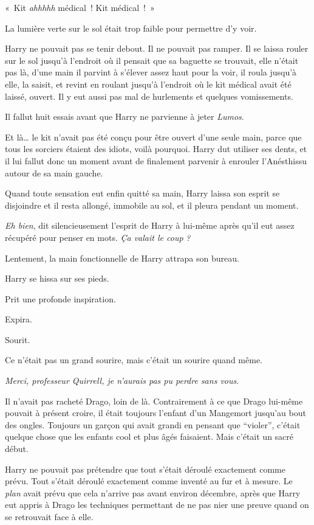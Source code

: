 «~Kit \emph{ahhhhh} médical~! Kit médical~!~»

La lumière verte sur le sol était trop faible pour permettre d'y voir.

Harry ne pouvait pas se tenir debout. Il ne pouvait pas ramper. Il se laissa rouler sur le sol jusqu'à l'endroit où il pensait que sa baguette se trouvait, elle n'était pas là, d'une main il parvint à s'élever assez haut pour la voir, il roula jusqu'à elle, la saisit, et revint en roulant jusqu'à l'endroit où le kit médical avait été laissé, ouvert. Il y eut aussi pas mal de hurlements et quelques vomissements.

Il fallut huit essais avant que Harry ne parvienne à jeter \emph{Lumos}.

Et là… le kit n'avait pas été conçu pour être ouvert d'une seule main, parce que tous les sorciers étaient des idiots, voilà pourquoi. Harry dut utiliser ses dents, et il lui fallut donc un moment avant de finalement parvenir à enrouler l'Anésthissu autour de sa main gauche.

Quand toute sensation eut enfin quitté sa main, Harry laissa son esprit se disjoindre et il resta allongé, immobile au sol, et il pleura pendant un moment.

\emph{Eh bien}, dit silencieusement l'esprit de Harry à lui-même après qu'il eut assez récupéré pour penser en mots. \emph{Ça valait le coup} \emph{?}

Lentement, la main fonctionnelle de Harry attrapa son bureau.

Harry se hissa sur ses pieds.

Prit une profonde inspiration.

Expira.

Sourit.

Ce n'était pas un grand sourire, mais c'était un sourire quand même.

\emph{Merci, professeur Quirrell, je n'aurais pas pu perdre sans vous}.

Il n'avait pas racheté Drago, loin de là. Contrairement à ce que Drago lui-même pouvait à présent croire, il était toujours l'enfant d'un Mangemort jusqu'au bout des ongles. Toujours un garçon qui avait grandi en pensant que “violer”, c'était quelque chose que les enfants cool et plus âgés faisaient. Mais c'était un sacré début.

Harry ne pouvait pas prétendre que tout s'était déroulé exactement comme prévu. Tout s'était déroulé exactement comme inventé au fur et à mesure. Le \emph{plan} avait prévu que cela n'arrive pas avant environ décembre, après que Harry eut appris à Drago les techniques permettant de ne pas nier une preuve quand on se retrouvait face à elle.

